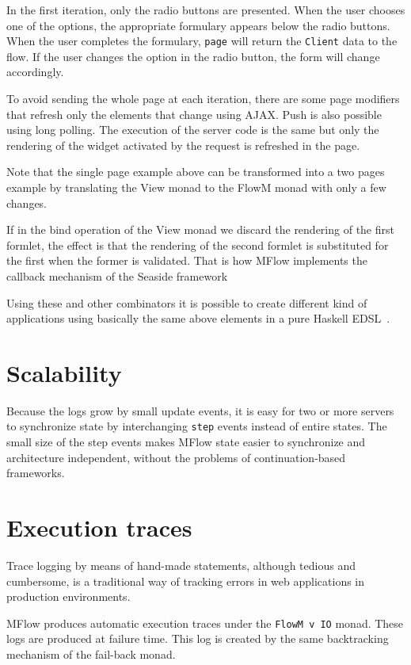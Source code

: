 \documentclass{tmr}
\begin{document}
In the first iteration, only the radio buttons are presented. When the user chooses one of the options, the appropriate formulary appears below the radio buttons. When the user completes the formulary, {\tt page} will return the {\tt Client} data to the flow. If the user changes the option in the radio button, the form will change accordingly. 
 
To avoid sending the whole page at each iteration, there are some page modifiers that refresh only the elements that change using AJAX\@. Push is also possible using long polling.  The execution of the server code is the same but only the rendering of the widget activated by the request is refreshed in the page.
 
Note that the single page example above can be transformed into a two pages example by translating the View monad to the FlowM monad with only a few changes. 
 
If in the bind operation of the View monad we discard the rendering of the first formlet, the effect is that the rendering of the second formlet is substituted for the first when the former is validated. That is how MFlow implements the callback mechanism of the Seaside framework~\cite{seasidecallback}

Using these and other combinators it is possible to create different kind of applications using basically the same above elements in a pure Haskell EDSL~\cite{auth:mflowdsl}.
 
\section{Scalability} 
 
Because the logs grow by small update events, it is easy for two or more servers to synchronize state by interchanging {\tt step} events instead of entire states. The small size of the step events  makes MFlow state easier to synchronize and architecture independent, without the problems of continuation-based frameworks. 
 
\section{Execution traces} 
 
Trace logging by means of hand-made statements, although tedious and cumbersome, is a traditional way of tracking errors in web applications in production environments.
 
MFlow produces automatic execution traces under the {\tt FlowM v IO} 
monad. These logs are produced at failure time. This log is created by the same backtracking mechanism of the fail-back monad.
\end{document}
